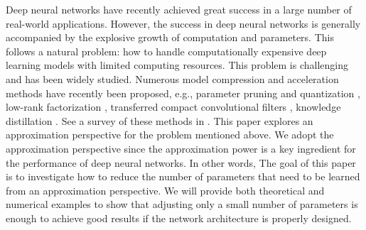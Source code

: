 \documentclass[nohyperref]{article}
\theoremstyle{plain}
\theoremstyle{definition}
\theoremstyle{remark}
\begin{document}
Deep neural networks have
recently achieved great success in a large number of real-world applications. However, 
the success in deep neural networks is generally accompanied by the explosive growth of computation and parameters. 
This follows a natural problem: how to handle computationally expensive deep learning models with limited computing resources. 
This problem is challenging and has been widely studied. 
Numerous model compression and acceleration
methods have recently been proposed, e.g., parameter pruning and quantization \cite{efficient:nets:2015,7780890,pmlr-v37-gupta15}, low-rank factorization \cite{10.5555/2968826.2968968,BMVC.28.88}, transferred compact convolutional filters \cite{DBLP:journals/corr/HowardZCKWWAA17,8578572,9010015}, knowledge distillation \cite{2015arXiv150302531H,9008829,9381661}. See a survey of these methods in \cite{survey:compression:acceleration}.
This paper explores an approximation perspective for the problem mentioned above. We adopt the approximation perspective since the approximation power is a key ingredient for the performance of deep neural networks. In other words,
The goal of this paper is to investigate how to reduce the number of parameters that need to be learned from an approximation perspective.
We will provide both theoretical and numerical examples to show that adjusting only a small number of parameters is enough to achieve good results if the network architecture is properly designed.



\end{document}
